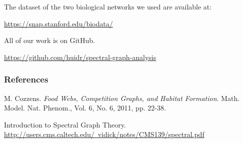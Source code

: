 \documentclass[aspectratio=43,leqno]{beamer}
\begin{document}
\begin{frame}
  \vfill
  The dataset of the two biological networks we used are available at:

  {\color{blue} \hyperref{https://snap.stanford.edu/biodata/}{}{}{https://snap.stanford.edu/biodata/} }
  \vfill
\end{frame}

\begin{frame}

  \vfill
  All of our work is on GitHub.
  
  {\color{blue} \hyperref{https://github.com/huidr/spectral-graph-analysis}{}{}{https://github.com/huidr/spectral-graph-analysis} }

  \vfill
  
\end{frame}


\begin{frame}
  \frametitle{References}

  \begin{thebibliography}{1}
  \bibitem[]{} M. Cozzens. \emph{Food Webs, Competition Graphs, and Habitat Formation}. Math. Model. Nat. Phenom., Vol. 6, No. 6, 2011, pp. 22-38.
  \end{thebibliography}

  \begin{thebibliography}{1}
  \bibitem[]{} Introduction to Spectral Graph Theory. \hyperref{http://users.cms.caltech.edu/~vidick/notes/CMS139/spectral.pdf}{}{}{http://users.cms.caltech.edu/~vidick/notes/CMS139/spectral.pdf}
  \end{thebibliography}

\end{frame}
\end{document}
